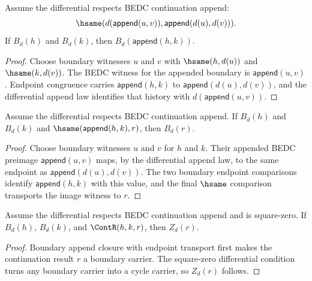 \begin{theorem}
\label{thm:homology-boundary-carrier-append-closed}
Assume the differential respects BEDC continuation append:
$$
\hsame(d(\mathsf{append}(u,v)),\mathsf{append}(d(u),d(v))).
$$
If $B_d(h)$ and $B_d(k)$, then
$B_d(\mathsf{append}(h,k))$.
\end{theorem}
\begin{proof}
Choose boundary witnesses $u$ and $v$ with $\hsame(h,d(u))$ and
$\hsame(k,d(v))$. The BEDC witness for the appended boundary is
$\mathsf{append}(u,v)$. Endpoint congruence carries
$\mathsf{append}(h,k)$ to $\mathsf{append}(d(u),d(v))$, and the differential
append law identifies that history with $d(\mathsf{append}(u,v))$.
\end{proof}

\begin{theorem}
\label{thm:homology-boundary-carrier-append-hsame-transport}
Assume the differential respects BEDC continuation append. If $B_d(h)$ and
$B_d(k)$ and $\hsame(\mathsf{append}(h,k),r)$, then $B_d(r)$.
\end{theorem}
\begin{proof}
Choose boundary witnesses $u$ and $v$ for $h$ and $k$. Their appended BEDC
preimage $\mathsf{append}(u,v)$ maps, by the differential append law, to the
same endpoint as $\mathsf{append}(d(u),d(v))$. The two boundary endpoint
comparisons identify $\mathsf{append}(h,k)$ with this value, and the final
$\hsame$ comparison transports the image witness to $r$.
\end{proof}

\begin{theorem}
\label{thm:homology-boundary-cont-cycle-closed}
Assume the differential respects BEDC continuation append and is square-zero.
If $B_d(h)$, $B_d(k)$, and $\ContR(h,k,r)$, then $Z_d(r)$.
\end{theorem}
\begin{proof}
Boundary append closure with endpoint transport first makes the continuation
result $r$ a boundary carrier. The square-zero differential condition turns any
boundary carrier into a cycle carrier, so $Z_d(r)$ follows.
\end{proof}

